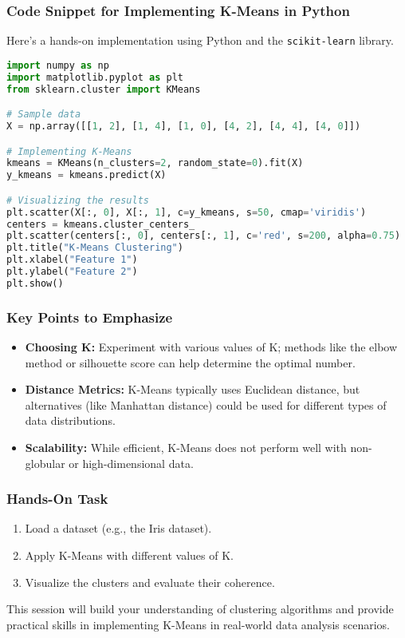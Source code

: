 \documentclass[aspectratio=169]{beamer}
\begin{document}
\begin{frame}[fragile]
    \frametitle{Code Snippet for Implementing K-Means in Python}
    Here’s a hands-on implementation using Python and the \texttt{scikit-learn} library.
    \begin{lstlisting}[language=Python]
import numpy as np
import matplotlib.pyplot as plt
from sklearn.cluster import KMeans

# Sample data
X = np.array([[1, 2], [1, 4], [1, 0], [4, 2], [4, 4], [4, 0]])

# Implementing K-Means
kmeans = KMeans(n_clusters=2, random_state=0).fit(X)
y_kmeans = kmeans.predict(X)

# Visualizing the results
plt.scatter(X[:, 0], X[:, 1], c=y_kmeans, s=50, cmap='viridis')
centers = kmeans.cluster_centers_
plt.scatter(centers[:, 0], centers[:, 1], c='red', s=200, alpha=0.75)
plt.title("K-Means Clustering")
plt.xlabel("Feature 1")
plt.ylabel("Feature 2")
plt.show()
    \end{lstlisting}
\end{frame}

\begin{frame}
    \frametitle{Key Points to Emphasize}
    \begin{itemize}
        \item \textbf{Choosing K:} Experiment with various values of K; methods like the elbow method or silhouette score can help determine the optimal number.
        \item \textbf{Distance Metrics:} K-Means typically uses Euclidean distance, but alternatives (like Manhattan distance) could be used for different types of data distributions.
        \item \textbf{Scalability:} While efficient, K-Means does not perform well with non-globular or high-dimensional data.
    \end{itemize}
\end{frame}

\begin{frame}
    \frametitle{Hands-On Task}
    \begin{enumerate}
        \item Load a dataset (e.g., the Iris dataset).
        \item Apply K-Means with different values of K.
        \item Visualize the clusters and evaluate their coherence.
    \end{enumerate}
    This session will build your understanding of clustering algorithms and provide practical skills in implementing K-Means in real-world data analysis scenarios.
\end{frame}
\end{document}
